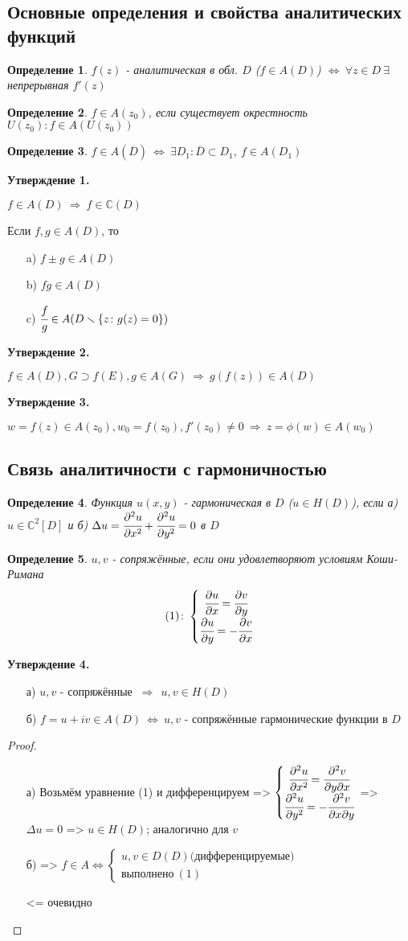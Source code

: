 \documentclass[draft]{report}
\newcommand{\dd}{\partial}
\newcommand{\then}{\ \Rightarrow\ }
\renewcommand{\C}{\mathbb{C}}
\newcommand{\LRA}{\Leftrightarrow}
\renewcommand{\bar}{\overline}
\renewcommand{\f}{\phi}
\newcommand{\D}{\Delta}
\newcommand{\sys}[1]{\left\{\begin{matrix}#1\end{matrix}\right.}
\newcommand{\opr}[1]{\begin{opred}#1\end{opred}}
\newtheorem*{opred}{Определение}
\theoremstyle{remark}
\begin{document}
\subsection{Основные определения и свойства аналитических функций}

\opr{$f(z)$ - аналитическая в обл. $D$ ($f\in A(D)$) $\LRA\ \forall z\in D\ \exists$ непрерывная $f'(z)$ }
\opr{$f\in A(z_0)$, если существует окрестность $U(z_0)\colon f\in A(U(z_0))$}
\opr{$f\in A(\bar{D})\ \LRA\ \exists D_1\colon \bar{D}\subset D_1,\ f\in A(D_1)$}

{\bfseries Утверждение 1.}

$f\in A(D)\then f\in \C(D)$

Если $f,g\in A(D)$, то
\begin{itemize}
\item[a)] $f\pm g\in A(D)$
\item[b)] $fg \in A(D)$
\item[c)] $\cfrac fg \in A(D\smallsetminus\{z\colon g(z)=0\})$
\end{itemize}

{\bfseries Утверждение 2.}

$f\in A(D), G\supset f(E), g\in A(G)\then g(f(z))\in A(D)$

{\bfseries Утверждение 3.}

$w=f(z)\in A(z_0), w_0=f(z_0), f'(z_0)\neq 0 \then z=\f(w)\in A(w_0)$

\subsection{Связь аналитичности с гармоничностью}

\opr{Функция $u(x,y)$ - гармоническая в $D$ ($u\in H(D)$), если а) $u\in\C^2[D]$ и б) $\D u=\cfrac{\dd^2u}{\dd x^2}+\cfrac{\dd^2u}{\dd y^2}=0$ в $D$}

\opr{$u,v$ - сопряжённые, если они удовлетворяют условиям Коши-Римана $$(1)\colon\sys{\cfrac{\dd u}{\dd x}=\cfrac{\dd v}{\dd y} \\ \cfrac{\dd u}{\dd y}=-\cfrac{\dd v}{\dd x}}$$}

{\bfseries Утверждение 4.}
\begin{itemize}
\item[а)] $u,v$ - сопряжённые $\then\ u,v\in H(D)$
\item[б)] $f=u+iv\in A(D)\ \LRA\ u,v$ - сопряжённые гармонические функции в $D$
\end{itemize}

\begin{proof}
\begin{itemize}
\item[а)] Возьмём уравнение (1) и дифференцируем =>
$\sys{\cfrac{\dd^2u}{\dd x^2}=\cfrac{\dd^2v}{\dd y\dd x} \\ \cfrac{\dd^2u}{\dd y^2}=-\cfrac{\dd^2v}{\dd x\dd y}}$
 => $\D u=0$ => $u\in H(D)$; аналогично для $v$
\item[б)] => $f\in A\LRA \sys{u,v\in D(D) \mbox{(дифференцируемые)} \\ \mbox{выполнено}\ (1)}$

<= очевидно
\end{itemize}
\end{proof}
\end{document}
